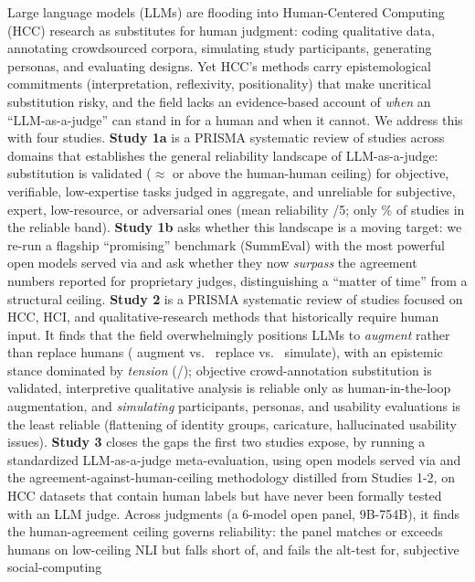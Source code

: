 \noindent
Large language models (LLMs) are flooding into Human-Centered Computing (HCC) research as substitutes for human
judgment: coding qualitative data, annotating crowdsourced corpora, simulating study participants, generating
personas, and evaluating designs. Yet HCC's methods carry epistemological commitments (interpretation, reflexivity,
positionality) that make uncritical substitution risky, and the field lacks an evidence-based account of
\emph{when} an ``LLM-as-a-judge'' can stand in for a human and when it cannot. We address this with four studies.
\textbf{Study 1a} is a PRISMA systematic review of \Nstudies{} studies across \Ndomains{} domains that establishes
the general reliability landscape of LLM-as-a-judge: substitution is validated ($\approx$ or above the
human-human ceiling) for objective, verifiable, low-expertise tasks judged in aggregate, and unreliable for
subjective, expert, low-resource, or adversarial ones (mean reliability \Meanrel/5; only \Pctreliable\% of studies
in the reliable band). \textbf{Study 1b} asks whether this landscape is a moving target: we re-run a flagship
``promising'' benchmark (SummEval) with the most powerful open models served via \PROVIDER{} and ask whether
they now \emph{surpass} the agreement numbers reported for proprietary judges, distinguishing a ``matter of time''
from a structural ceiling. \textbf{Study 2} is a PRISMA systematic review of \STN{} studies focused on HCC, HCI, and
qualitative-research methods that historically require human input. It finds that the field overwhelmingly positions
LLMs to \emph{augment} rather than replace humans (\STaugment{} augment vs.\ \STreplace{} replace vs.\ \STsimulate{}
simulate), with an epistemic stance dominated by \emph{tension} (\STtension/\STN); objective crowd-annotation
substitution is validated, interpretive qualitative analysis is reliable only as human-in-the-loop augmentation, and
\emph{simulating} participants, personas, and usability evaluations is the least reliable (flattening of identity
groups, caricature, hallucinated usability issues). \textbf{Study 3} closes the gaps the
first two studies expose, by running a standardized LLM-as-a-judge meta-evaluation, using open models served via
\PROVIDER{} and the agreement-against-human-ceiling methodology distilled from Studies 1-2, on HCC datasets
that contain human labels but have never been formally tested with an LLM judge. Across \STHRn{} judgments (a
6-model open panel, 9B-754B), it finds the human-agreement ceiling governs reliability: the panel matches or
exceeds humans on low-ceiling NLI but falls short of, and fails the alt-test for, subjective social-computing
